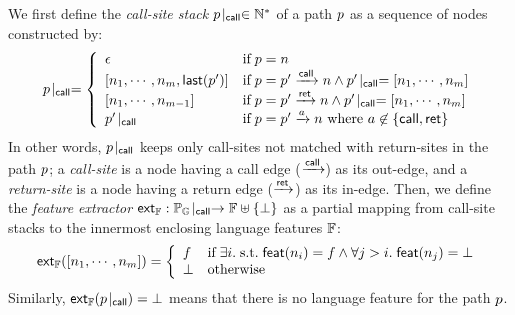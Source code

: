We first define the \textit{call-site stack} ${p}\!\mid_{\textsf{call}} \in \mathbb{N}^*$ of a
path $p$ as a sequence of nodes constructed by:
\begin{equation}\label{equ:css}
  {p}\!\mid_{\textsf{call}} = \left\{
    \begin{array}{ll}
      \epsilon &
      \text{if} \; p = n\\

      {[n_1, \cdots, n_m, \textsf{last}(p')]} &
      \text{if} \; p = p' \xrightarrow{\textsf{call}} n \wedge
      {p'}\!\mid_{\textsf{call}} = [n_1, \cdots, n_m]\\

      {[n_1, \cdots, n_{m-1}]} &
      \text{if} \; p = p' \xrightarrow{\textsf{ret}} n \wedge
      {p'}\!\mid_{\textsf{call}} = [n_1, \cdots, n_m]\\

      {p'}\!\mid_{\textsf{call}} &
      \text{if} \; p = p' \xrightarrow{a} n\ \mbox{where } a
                    \not\in \{ \textsf{call}, \textsf{ret} \}

    \end{array}
  \right.
\end{equation}
In other words, ${p}\!\mid_{\textsf{call}}$ keeps only call-sites not matched with return-sites
in the path $p$;  a \textit{call-site} is a node having a call edge ($\xrightarrow{\textsf{call}}$)
as its out-edge, and a \textit{return-site} is a node having a return edge
($\xrightarrow{\textsf{ret}}$) as its in-edge.
%
Then, we define the \textit{feature extractor} $\textsf{ext}_{\mathbb{F}}: {\mathbb{P}_{\mathbb{G}}}\!\mid_{\textsf{call}}
\rightarrow \mathbb{F} \uplus \{ \bot \}$ as a partial mapping from call-site
stacks to the innermost enclosing language features $\mathbb{F}$:
\begin{equation}\label{equ:extfeat}
  \textsf{ext}_{\mathbb{F}}([n_1, \cdots, n_m]) = \left\{
    \begin{array}{ll}
      f & \text{if} \;
      \exists i. {\; \text{s.t.} \; } \textsf{feat}(n_i) = f \wedge
      \forall j > i. \; \textsf{feat}(n_j) = \bot
      \\

      \bot & \text{otherwise}
    \end{array}
  \right.
\end{equation}
%
Similarly, $\textsf{ext}_{\mathbb{F}}({p}\!\mid_{\textsf{call}}) = \bot$ means that there is no language feature
for the path $p$.


